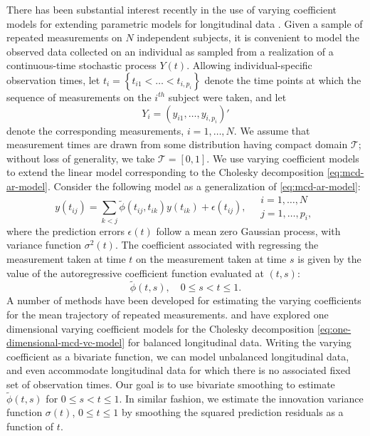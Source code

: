 There has been substantial interest recently in the use of varying coefficient models for extending parametric models for longitudinal data \citep{noh2010sparse,csenturk2013modeling,csenturk2008generalized,chiang2001smoothing,hoover1998nonparametric,fan1999statistical}. Given a sample of repeated measurements on $N$ independent subjects, it is convenient to model the observed data collected on an individual as sampled from a realization of a continuous-time stochastic process $Y\left(t\right)$. Allowing individual-specific observation times, let $t_{i} = \left\{t_{i1} <  \dots < t_{i,p_i}\right\}$ denote the time points at which the sequence of measurements on the $i^{th}$ subject were taken, and let
\[
Y_i = \left(y_{i1}, \dots, y_{i,p_i}\right)'
\]
\noindent
denote the corresponding measurements, $i = 1, \dots, N$. We assume that measurement times are drawn from some distribution having compact domain $\mathcal{T}$; without loss of generality, we take $\mathcal{T} = \left[0,1\right]$. We use varying coefficient models to extend the linear model corresponding to the Cholesky decomposition \eqref{eq:mcd-ar-model}. Consider the following model as a generalization of \eqref{eq:mcd-ar-model}: 
\begin{equation}  \label{eq:cholesky-regression-model-1} 
y\left(t_{ij} \right)  = \sum_{k < j} \tilde{\phi}\left(t_{ij} ,t_{ik}\right) y\left(t_{ik}\right) + \epsilon\left({t_{ij}}\right), \quad \begin{array}{l} i = 1, \dots, N\\ j = 1, \dots, p_i,\end{array}
\end{equation}
\noindent
where the prediction errors $\epsilon\left(t\right)$ follow a mean zero Gaussian process, with variance function $\sigma^2\left(t\right)$. The coefficient associated with regressing the measurement taken at time $t$ on the measurement taken at time $s$ is given by the value of the autoregressive coefficient function evaluated at $\left(t,s\right)$:
\[
\tilde{\phi}\left(t,s\right), \quad 0 \le s < t \le 1.
\]
A number of methods have been developed for estimating the varying coefficients for the mean trajectory of repeated measurements. \cite{wu2003nonparametric} and \cite{dahlhaus1997fitting} have explored one dimensional varying coefficient models for the Cholesky decomposition \eqref{eq:one-dimensional-mcd-vc-model} for balanced longitudinal data. Writing the varying coefficient as a bivariate function, we can model unbalanced longitudinal data, and even accommodate longitudinal data for which there is no associated fixed set of observation times. Our goal is to use bivariate smoothing to estimate $\tilde{\phi}\left(t,s\right)$ for $0 \le s < t \le 1$. In similar fashion, we estimate the innovation variance function $\sigma\left(t \right)$, $0 \le t \le 1$ by smoothing the squared prediction residuals as a function of $t$. 

